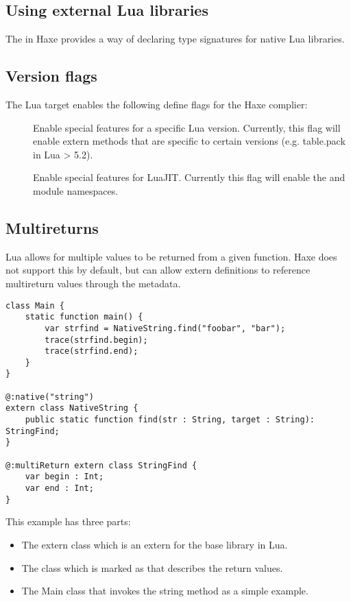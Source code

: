 \subsection{Using external Lua libraries}
\label{target-lua-external-libraries}

The  in Haxe provides a way of declaring type signatures
for native Lua libraries.

\subsection{Version flags}
\label{target-lua-flags}

The Lua target enables the following define flags for the Haxe complier:

\begin{description}
	\item[] Enable special features for a specific Lua version. Currently, this flag will enable extern methods that are specific to certain versions (e.g. table.pack in Lua > 5.2).
	\item[] Enable special features for LuaJIT.  Currently this flag will enable the  and  module namespaces.
\end{description}

\subsection{Multireturns}
\label{target-lua-multireturns}

Lua allows for multiple values to be returned from a given function.  Haxe
does not support this by default, but can allow extern definitions to reference
multireturn values through the  metadata.

\begin{lstlisting}
class Main {
    static function main() {
        var strfind = NativeString.find("foobar", "bar");
        trace(strfind.begin);
        trace(strfind.end);
    }
}

@:native("string")
extern class NativeString {
	public static function find(str : String, target : String): StringFind;
}

@:multiReturn extern class StringFind {
	var begin : Int;
	var end : Int;
}
\end{lstlisting}

This example has three parts:

\begin{itemize}
	\item The extern class  which is an extern for the base  library in Lua.
	\item The  class which is marked as  that describes the return values.
	\item The Main class that invokes the string method as a simple example.
\end{itemize}

